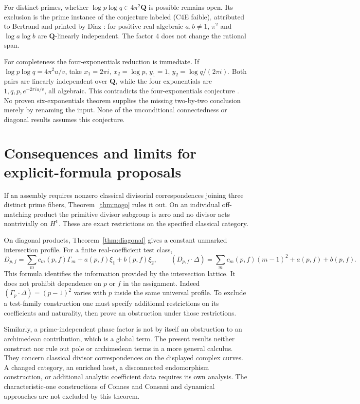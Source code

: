 \documentclass[11pt]{article}
\theoremstyle{definition}
\theoremstyle{remark}
\newcommand{\Q}{\mathbf{Q}}
\begin{document}
For distinct primes, whether $\log p\log q\in4\pi^2\Q$ is possible remains
open. Its exclusion is the prime instance of the conjecture labeled
(C4E faible), attributed to Bertrand and printed by Diaz \cite[p.~231]{Dia97}:
for positive real algebraic $a,b\ne1$, $\pi^2$ and $\log a\log b$ are
$\Q$-linearly independent. The factor $4$ does not change the rational span.

For completeness the four-exponentials reduction is immediate. If
$\log p\log q=4\pi^2u/v$, take $x_1=2\pi i$, $x_2=\log p$,
$y_1=1$, $y_2=\log q/(2\pi i)$. Both pairs are linearly independent over
$\Q$, while the four exponentials are $1,q,p,e^{-2\pi iu/v}$, all algebraic.
This contradicts the four-exponentials conjecture \cite{FourExp}.
No proven six-exponentials theorem supplies the missing two-by-two
conclusion merely by renaming the input. None of the unconditional
connectedness or diagonal results assumes this conjecture.

\section{Consequences and limits for explicit-formula proposals}\label{sec:scope}
If an assembly requires nonzero classical divisorial correspondences joining
three distinct prime fibers, Theorem~\ref{thm:nogo} rules it out. On an
individual off-matching product the primitive divisor subgroup is zero and
no divisor acts nontrivially on $H^1$. These are exact restrictions on the
specified classical category.

On diagonal products, Theorem~\ref{thm:diagonal} gives a constant unmarked
intersection profile. For a finite real-coefficient test class,
\[
 D_{p,f}=\sum_m c_m(p,f)\Gamma_m+a(p,f)\xi_1+b(p,f)\xi_2,
 \qquad
 (D_{p,f}\cdot\Delta)=\sum_m c_m(p,f)(m-1)^2+a(p,f)+b(p,f).
\]
This formula identifies the information provided by the intersection lattice.
It does not prohibit dependence on $p$ or $f$ in the assignment. Indeed
$(\Gamma_p\cdot\Delta)=(p-1)^2$ varies with $p$ inside the same universal
profile. To exclude a test-family construction one must specify additional
restrictions on its coefficients and naturality, then prove an obstruction
under those restrictions.

Similarly, a prime-independent phase factor is not by itself an obstruction
to an archimedean contribution, which is a global term. The present results
neither construct nor rule out pole or archimedean terms in a more general
calculus. They concern classical divisor correspondences on the displayed
complex curves. A changed category, an enriched host, a disconnected
endomorphism construction, or additional analytic coefficient data requires
its own analysis. The characteristic-one constructions of Connes and Consani
and dynamical approaches are not excluded by this theorem.
\end{document}
